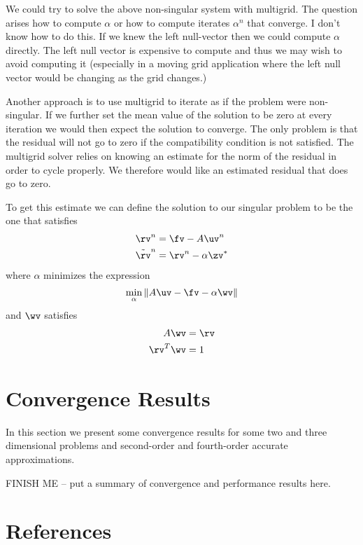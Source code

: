 \documentclass{article}
\begin{document}
We could try to solve the above non-singular system with multigrid. The
question arises how to compute $\alpha$ or how to compute iterates
$\alpha^n$ that converge. I don't know how to do this. 
If we knew the left null-vector then we could compute $\alpha$ directly.
The left null vector is expensive to compute and thus we may wish to avoid
computing it (especially in a moving grid application where the left null
vector would be changing as the grid changes.)

Another approach is to use multigrid to iterate as if the problem were
non-singular. If we further set the mean value of the solution to 
be zero at every iteration we would then expect the solution to 
converge. The only problem is that the residual will not go to
zero if the compatibility condition is not satisfied. 
The multigrid solver relies on knowing an estimate for the
norm of the residual in order to cycle properly. We therefore
would like an estimated residual that does go to zero. 

To get this estimate we can define the solution to our singular problem
to be the one that satisfies
\begin{align*}
    \rv^n & = \fv - A \uv^n \\    
    \tilde{\rv}^n &= \rv^n -\alpha \zv^*
\end{align*}
where $\alpha$ minimizes the expression
\[
    \min_\alpha \| A \uv - \fv - \alpha \wv \|
\]
and $\wv$ satisfies
\begin{align*}
     A \wv &= \rv \\
     \rv^T \wv &= 1
\end{align*}


\clearpage
\section{Convergence Results}\label{sec:convergenceResults}

In this section we present some convergence results for some
two and three dimensional problems and second-order and fourth-order
accurate approximations.



FINISH ME -- put a summary of convergence and performance results here.


\clearpage



\clearpage
\section{References}




% 



\printindex
\end{document}
